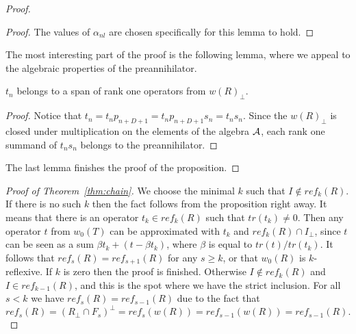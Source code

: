 \documentclass[12pt]{amsart}
\theoremstyle{case}
\begin{document}
\begin{proof}
    \begin{proof}
      The values of $\alpha_{nl}$ are chosen specifically for this lemma to hold.
    \end{proof}
    The most interesting part of the proof is the following lemma, where we appeal to the algebraic properties
      of the preannihilator.
    \begin{lemma}
     $t_n$ belongs to a span of rank one operators from $w(R)_\perp$.
    \end{lemma}
    \begin{proof}
      Notice that $t_n = t_n p_{n + D + 1} = t_n p_{n + D + 1} s_n = t_n s_n.$
      Since the $w(R)_\perp$ is closed under multiplication on the elements of the algebra $\cal{A}$,
        each rank one summand of $t_n s_n$ belongs to the preannihilator.
    \end{proof}
    The last lemma finishes the proof of the proposition.
  \end{proof}

  \begin{proof}[Proof of Theorem~\ref{thm:chain}]
    We choose the minimal $k$ such that $I \not\in ref_k(R)$.
    If there is no such $k$ then the fact follows from the proposition right away.
    It means that there is an operator $t_k \in ref_k(R)$ such that $tr(t_k) \neq 0$.
    Then any operator $t$ from $w_0(T)$ can be approximated with $t_k$ and $ref_k(R) \cap I_\perp$,
      since $t$ can be seen as a sum $\beta t_k + (t - \beta t_k)$, where $\beta$ is equal to $tr(t)/ tr(t_k)$.
    It follows that $ref_s(R) = ref_{s+1}(R)$ for any $s \geq k$, or that $w_0(R)$ is $k$-reflexive.
    If $k$ is zero then the proof is finished.
    Otherwise $I \not\in ref_k(R)$ and $I \in ref_{k - 1}(R)$, and this is the spot where we have
      the strict inclusion.
    For all $s < k$ we have $ref_s(R) = ref_{s-1}(R)$ due to the fact that
    \[
      ref_s(R) = (R_\perp \cap F_s)^\perp = ref_s(w(R)) = ref_{s - 1}(w(R)) = ref_{s-1}(R).
    \]
  \end{proof}
\end{document}
